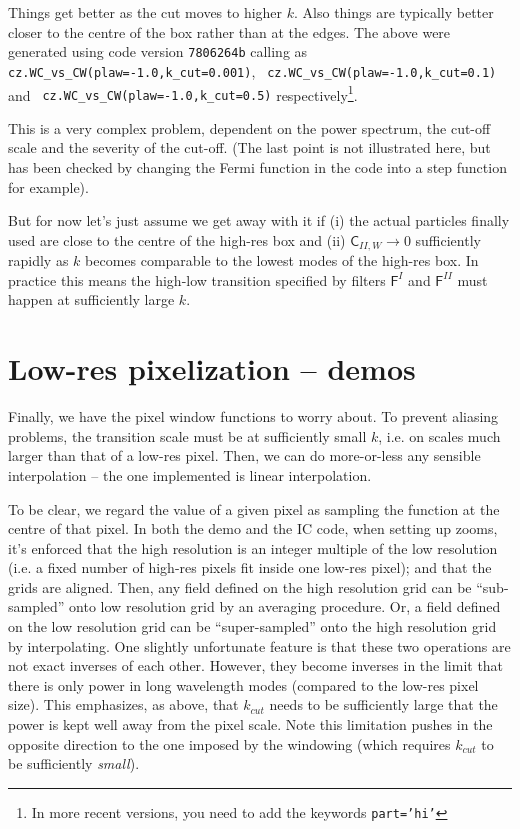 \documentclass[11pt,a4paper,preprint]{aastex}
\begin{document}
Things get better as the cut moves to higher $k$. Also things are
typically better closer to the centre of the box rather than at the
edges.  The above were generated using code version {\tt 7806264b}
calling as {\tt cz.WC\_vs\_CW(plaw=-1.0,k\_cut=0.001)}, {\tt
  cz.WC\_vs\_CW(plaw=-1.0,k\_cut=0.1)} and {\tt
  cz.WC\_vs\_CW(plaw=-1.0,k\_cut=0.5)} respectively\footnote{In more recent
  versions, you need to add the keywords {\tt part='hi'}}.

This is a very complex problem, dependent on the power spectrum, the
cut-off scale and the severity of the cut-off. (The last point is not
illustrated here, but has been checked by changing the Fermi function
in the code into a step function for example).

But for now let's just assume we get
away with it if (i) the actual particles finally used are close to the
centre of the high-res box and (ii) $\mathsf{C}_{II,W} \to 0$
sufficiently rapidly as $k$ becomes comparable to the lowest modes of
the high-res box. In practice this means the high-low transition
specified by filters $\mathsf{F}^I$ and $\mathsf{F}^{II}$ must happen
at sufficiently large $k$.



\section{Low-res pixelization -- demos}\label{sec:low-res-pixelization}

Finally, we have the pixel window functions to worry about.  To
prevent aliasing problems, the transition scale must be at
sufficiently small $k$, i.e. on scales much larger than that of a
low-res pixel.  Then, we can do more-or-less any sensible
interpolation -- the one implemented is linear interpolation.

To be clear, we regard the value of a given pixel as sampling the 
function at the centre of that pixel. In both the demo and the IC
code, when setting up zooms, it's enforced that the high
resolution is an integer multiple of the low resolution (i.e. a
fixed number of high-res pixels fit inside one low-res pixel); and
that the grids are aligned. Then, any field defined on the
high resolution grid can be ``sub-sampled'' onto low resolution grid by
an averaging procedure. Or, a field defined on the low resolution
grid can be ``super-sampled'' onto the high resolution grid
by interpolating. One slightly unfortunate feature is that these
two operations are not exact inverses of each other. However,
they become inverses in the limit that there is only power in
long wavelength modes (compared to the low-res pixel size).
This emphasizes, as above, that $k_{cut}$ needs to be sufficiently large that
the power is kept well away from the pixel scale. Note this 
limitation pushes in the opposite direction to the one imposed
by the windowing (which requires $k_{cut}$ to be sufficiently 
{\it small}). 
\end{document}
